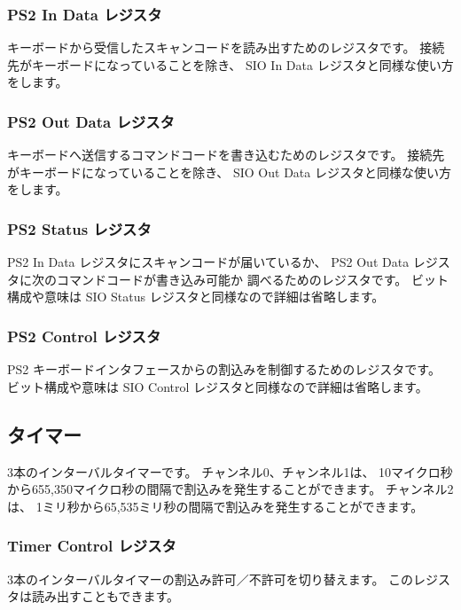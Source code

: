 \subsubsection{PS2 In Data レジスタ}

キーボードから受信したスキャンコードを読み出すためのレジスタです。
接続先がキーボードになっていることを除き、
SIO In Data レジスタと同様な使い方をします。

\subsubsection{PS2 Out Data レジスタ}

キーボードへ送信するコマンドコードを書き込むためのレジスタです。
接続先がキーボードになっていることを除き、
SIO Out Data レジスタと同様な使い方をします。

\subsubsection{PS2 Status レジスタ}

PS2 In Data レジスタにスキャンコードが届いているか、
PS2 Out Data レジスタに次のコマンドコードが書き込み可能か
調べるためのレジスタです。
ビット構成や意味は SIO Status レジスタと同様なので詳細は省略します。

\subsubsection{PS2 Control レジスタ}

PS2 キーボードインタフェースからの割込みを制御するためのレジスタです。
ビット構成や意味は SIO Control レジスタと同様なので詳細は省略します。

\subsection{タイマー}

3本のインターバルタイマーです。
チャンネル0、チャンネル1は、
10マイクロ秒から655,350マイクロ秒の間隔で割込みを発生することができます。
チャンネル2は、
1ミリ秒から65,535ミリ秒の間隔で割込みを発生することができます。

\subsubsection{Timer Control レジスタ}

3本のインターバルタイマーの割込み許可／不許可を切り替えます。
このレジスタは読み出すこともできます。

